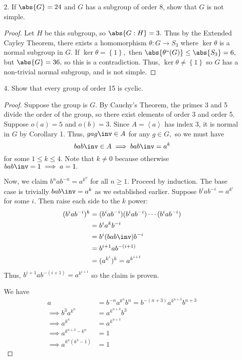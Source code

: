 \documentclass{article}
\begin{document}
\begin{itemize}
	\item[2.] If $\abs{G}=24$ and $G$ has a subgroup of order 8, show that $G$ is not simple.
		\begin{proof}
			Let $H$ be this subgroup, so $\abs{G:H}=3.$ Thus by the Extended Cayley Theorem, there exists a homomorphism $\theta:G\to S_3$ where $\ker \theta$ is a normal subgroup in $G.$ If $\ker \theta=\left\{ 1 \right\},$ then $\abs{\theta``(G)}\le \abs{S_3}=6,$ but $\abs{G}=36,$ so this is a contradiction. Thus, $\ker\theta\neq \left\{ 1 \right\}$ so $G$ has a non-trivial normal subgroup, and is not simple.
			
		\end{proof}

		\newpage
	\item[4.] Show that every group of order 15 is cyclic.
		\begin{proof}
			Suppose the group is $G.$ By Cauchy's Theorem, the primes 3 and 5 divide the order of the group, so there exist elements of order 3 and order 5. Suppose $o(a)=5$ and $o(b)=3.$ Since $A=\left< a\right>$ has index 3, it is normal in $G$ by Corollary 1. Thus, $gag\inv\in A$ for any $g\in G,$ so we must have \[bab\inv \in A\implies bab\inv = a^k\] for some $1\le k\le 4.$ Note that $k\neq 0$ because otherwise $bab\inv=1\implies a=1.$ 

			Now, we claim $b^n ab^{-n}=a^{k^n}$ for all $n\ge 1.$ Proceed by induction. The base case is trivially $bab\inv=a^k$ as we established earlier. Suppose $b^i ab^{-i}=a^{k^i}$ for some $i.$ Then raise each side to the $k$ power:
			\begin{align*}
				(b^i ab^{-i})^k &= (b^iab^{-i})(b^i ab^{-i}) \cdots (b^i ab^{-i}) \\
				&= b^i a^k b^{-i} \\
				&= b^i (bab\inv)b^{-i} \\
				&= b^{i+1} ab^{-(i+1)} \\
				&= (a^{k^i})^k = a^{k^{i+1}}
			\end{align*}
			Thus, $b^{i+1}ab^{-(i+1)} = a^{k^{i+1}}$ so the claim is proven. 

			We have 
			\begin{align*}
				a&=b^{-n} a^{k^n} b^n = b^{-(n+3)} a^{k^{n+3}} b^{n+3} \\
				\implies b^3 a^{k^n} &= a^{k^{n+3}} b^3 \\
				\implies a^{k^n} &= a^{k^{n+3}} \\
				\implies a^{k^{n+3}-k^n} &= 1 \\
				\implies a^{k^n(k^3-1)} &= 1
			\end{align*}


\end{proof}
\end{itemize}
\end{document}
